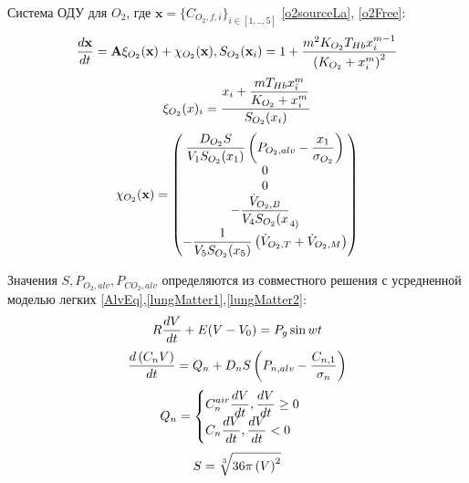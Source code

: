 Система ОДУ для $O_{2}$, где $\mathbf{x}=\{ C_{O_{2},f,i} \}_{i \in [1,..,5]}$ \eqref{o2sourceLa}, \eqref{o2Free}:
\begin{equation}
\displaystyle \frac{d\textbf{x}}{dt}
=\mathbf{A} \mathbf{\xi}_{O_{2}}(\textbf{x})+\mathbf{\chi}_{O_{2}}(\textbf{x}), S_{O_{2}}(\textbf{x}_{i})=1+\frac{m^2K_{O_{2}}T_{Hb}x_{i}^{m-1}}{\left( K_{O_{2}}+x_{i}^m\right)^2}\notag
\end{equation}
\begin{equation}
\mathbf{\xi}_{O_{2}}(x)_{i}=\frac{\displaystyle x_{i}+\frac{m T_{Hb}x_{i}^{m}}{ K_{O_{2}}+x_{i}^m}}{S_{O_{2}}(x_{i})}\notag
\end{equation}
\begin{equation}
\mathbf{\chi}_{O_{2}}(\textbf{x})=\begin{pmatrix}
\displaystyle \frac{D_{O_{2}}S}{V_{1}S_{O_{2}}(x_{1})}\left(P_{O_{2},alv}-\frac{x_{1}}{\sigma_{O_{2}}} \right) \\
0 \\
0 \\
\displaystyle -\frac{\dot{V}_{O_{2},B}}{V_{4}S_{O_{2}}(x}_{4)} \\
\displaystyle -\frac{1}{V_{5}S_{O_{2}}(x_{5})}\left(\dot{V}_{O_{2},T}+\dot{V}_{O_{2},M}\right)
\end{pmatrix}\notag
\end{equation}

Значения $S, P_{O_{2},alv}, P_{CO_{2},alv}$ определяются из совместного решения с усредненной моделью легких \eqref{AlvEq},\eqref{lungMatter1},\eqref{lungMatter2}:
\begin{equation}
R\frac{dV}{dt}+E(V-V_{0})=P_{g}\sin wt \notag
\end{equation}
\begin{equation}
\frac{d\left(C_{n}V\right)}{dt}  = Q_{n}+D_{n}S\left(P_{n,alv}-\frac{C_{n,1}}{\sigma_{n}}\right)\notag
\end{equation}
\begin{equation}
Q_{n}= \begin{cases} \displaystyle
C_{n}^{air}\frac{dV}{dt}, \frac{dV}{dt} \ge 0 \\
\displaystyle
C_{n}\frac{dV}{dt},  \frac{dV}{dt} <0
\end{cases}\notag
\end{equation}
\begin{equation}
S =\sqrt[{3}]{36\pi \left(V \right)^{2} }\notag
\end{equation}

